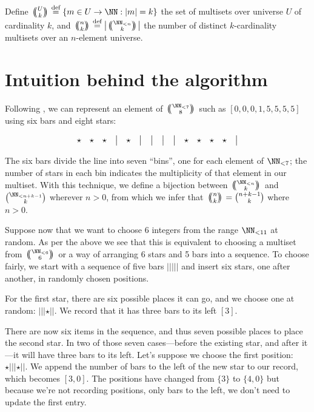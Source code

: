 \documentclass[letterpaper,luatex,11pt]{article}
\newcommand{\multichoose}[2]{
\left.\mathchoice
  {\left(\kern-0.48em\binom{#1}{#2}\kern-0.48em\right)}
  {\big(\kern-0.30em\binom{\smash{#1}}{\smash{#2}}\kern-0.30em\big)}
  {\left(\kern-0.30em\binom{\smash{#1}}{\smash{#2}}\kern-0.30em\right)}
  {\left(\kern-0.30em\binom{\smash{#1}}{\smash{#2}}\kern-0.30em\right)}
\right.}
\newcommand*{\defeq}{\stackrel{\text{def}}{=}}
\begin{document}
Define $\multichoose{U}{k} \defeq \{m \in U \rightarrow \NN: |m| = k\}$ the set of multisets over
universe \(U\) of cardinality \(k\), and \(\multichoose{n}{k} \defeq \left|\multichoose{\NN_{<n}}{k}\right|\)
the number of distinct \(k\)-cardinality multisets over an \(n\)-element universe.

\section{Intuition behind the algorithm}

Following \cite{feller}, we can represent an element of \(\multichoose{\NN_{<7}}{8}\)
such as \([0,0,0,1,5,5,5,5]\) using six bars and eight stars:

\begin{displaymath}
    \begin{array}{ c c c c c c c c c c c c c c c }
        \star & \star & \star & \big| & \star & \big| & \big| & \big| & \big| & \star & \star & \star & \star & \big| \\
    \end{array}
\end{displaymath}

The six bars divide the line into seven ``bins'', one for each element of \(\NN_{<7}\); the
number of stars in each bin indicates the multiplicity of that element in our multiset.
With this technique, we define a bijection between \(\multichoose{\NN_{<n}}{k}\) and
\(\binom{\NN_{<n + k - 1}}{k}\) wherever \(n > 0\), from which we infer that
\(\multichoose{n}{k} = \binom{n + k - 1}{k}\) where \(n > 0\).

Suppose now that we want to choose 6 integers from the range $\NN_{<11}$ 
at random. As per the above we see that this 
is equivalent to choosing a multiset from \(\multichoose{\NN_{<6}}{6}\)
or a way of arranging 6 stars and 5 bars into a sequence.
To choose fairly, we start with a sequence of five bars \(|||||\) and insert six stars,
one after another, in randomly chosen positions.

For the first star, there are six possible places it can go, and we choose one at random:
\(|||\star||\). We record that it has three bars to its left \([3]\).

There are now six items in the sequence, and thus seven possible places to place the second star.
In two of those seven cases---before the existing star, and after it---it will have three bars
to its left. Let's suppose we choose the first position: \(\star|||\star||\). We append
the number of bars to the left of the new star to our record, which becomes \([3, 0]\).
The positions have changed from \(\{3\}\)
to \(\{4, 0\}\) but because we're not recording positions, only bars to the left, we don't need to
update the first entry.
\end{document}
